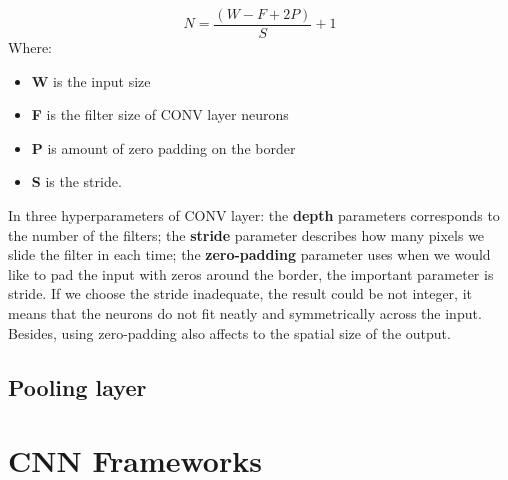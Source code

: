 \begin{equation}
	N = \frac{(W - F + 2P)}{S} + 1
	\label{convneuron}
\end{equation}
Where:
\begin{itemize}
	\item \textbf{W} is the input size
	\item \textbf{F} is the filter size of CONV layer neurons
	\item \textbf{P} is amount of zero padding on the border
	\item \textbf{S} is the stride.
\end{itemize}

In three hyperparameters of CONV layer: the \textbf{depth} parameters corresponds to the number of the filters; the \textbf{stride} parameter describes how many pixels we slide the filter in each time; the \textbf{zero-padding} parameter uses when we would like to pad the input with zeros around the border, the important parameter is stride. If we choose the stride inadequate, the result could be not integer, it means that the neurons do not fit neatly and symmetrically across the input. Besides, using zero-padding also affects to the spatial size of the output.

\subsection{Pooling layer}

\section{CNN Frameworks}

